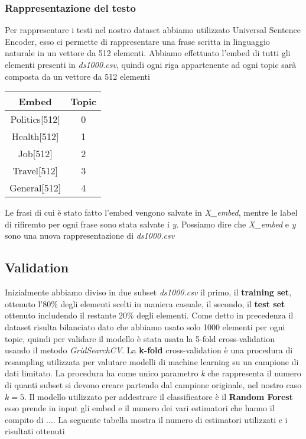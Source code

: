 \subsubsection{Rappresentazione del testo}
\label{sssec:rappresentazione}
Per rappresentare i testi nel nostro dataset abbiamo utilizzato Universal Sentence Encoder, esso ci permette di rappresentare una frase scritta in linguaggio naturale in un vettore da 512 elementi.\newline
Abbiamo effettuato l'embed di tutti gli elementi presenti in \textit{ds1000.csv}, quindi ogni riga appartenente ad ogni topic sarà composta da un vettore da 512 elementi
\FloatBarrier
\begin{table}[h]
\centering
\begin{tabular}{|c|c|}
\hline
\textbf{Embed} & \textbf{Topic} \\ \hline
Politics{[}512{]} & 0 \\ \hline
Health{[}512{]} & 1 \\ \hline
Job{[}512{]} & 2 \\ \hline
Travel{[}512{]} & 3 \\ \hline
General{[}512{]} & 4 \\ \hline
\end{tabular}
\end{table}
Le frasi di cui è stato fatto l'embed vengono salvate in \textit{X\_embed}, mentre le label di rifiremto per ogni frase sono stata salvate i \textit{y}. Possiamo dire che \textit{X\_embed} e \textit{y} sono una nuova rappresentazione di \textit{ds1000.csv}

\subsection{Validation}
Inizialmente abbiamo diviso in due subset \textit{ds1000.csv} il primo, il \textbf{training set}, ottenuto l'80\% degli elementi scelti in maniera casuale, il secondo, il \textbf{test set} ottenuto includendo il restante 20\% degli elementi.\newline
Come detto in precedenza il dataset risulta bilanciato dato che abbiamo usato solo 1000 elementi per ogni topic, quindi per validare il modello è stata usata la 5-fold cross-validation usando il metodo \textit{GridSearchCV}.\newline
La \textbf{k-fold} cross-validation è una procedura di resampling utilizzata per valutare modelli di machine learning su un campione di dati limitato. La procedura ha come unico parametro \textit{k} che rappresenta il numero di quanti subset si devono creare partendo dal campione originale, nel nostro caso $ k = 5 $.\newline
Il modello utilizzato per addestrare il classificatore è il \textbf{Random Forest} esso prende in input gli embed e il numero dei vari estimatori che hanno il compito di .... La seguente tabella mostra il numero di estimatori utilizzati e i risultati ottenuti

